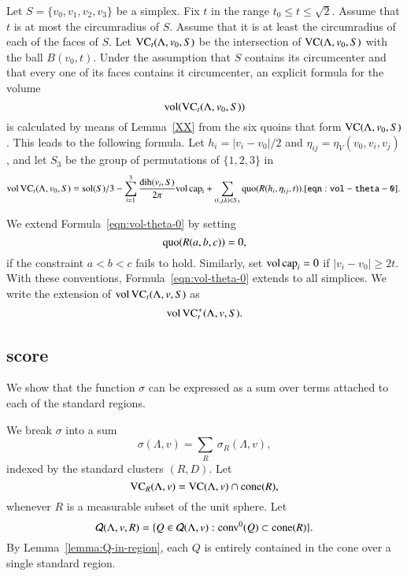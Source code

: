  Let $S=\{v_0,v_1,v_2,v_3\}$ be a simplex. Fix $t$ in the range
$t_0\le t\le\sqrt2$.  Assume that $t$ is at most the circumradius
of $S$. Assume that it is at least the circumradius of each of the
faces of $S$.  Let ${\operatorname{VC}}_t(\Lambda,v_0,S)$ be the intersection of
${\operatorname{VC}}(\Lambda,v_0,S)$ with the ball $B(v_0,t)$. Under the assumption
that $S$ contains its circumcenter and that every one of its faces
contains it circumcenter, an explicit formula for the volume
$${\operatorname{vol}}({\operatorname{VC}}_t(\Lambda,v_0,S))$$ is calculated by means of
Lemma~\ref{XX} from the six quoins that form ${\operatorname{VC}}(\Lambda,v_0,S)$.
This leads to the
following formula. Let $h_i = |v_i-v_0|/2$ and
$\eta_{ij}=\eta_V(v_0,v_i,v_j)$, and let $S_3$ be the group of
permutations of $\{1,2,3\}$ in
\begin{equation}
   \op{vol}\,\op{VC}_t(\Lambda,v_0,S) =
   \sol(S)/3 - \sum_{i=1}^3 \frac{\dih(v_i,S)}{2\pi}\op{vol}\,\op{cap_i}
   +\sum_{(i,j,k)\in S_3} \quo(R(h_i,\eta_{ij},t)).
   \tlabel{eqn:vol-theta-0}
\end{equation}


We extend Formula~\ref{eqn:vol-theta-0} by setting
    $$\operatorname{quo}(R(a,b,c)) = 0,$$
if the constraint $a < b < c$ fails to hold.  Similarly, set
${\operatorname{vol}}\,{\operatorname{cap}}_i=0$ if $|v_i-v_0|\ge 2t$.  With these
conventions,  Formula~\ref{eqn:vol-theta-0} extends to all
simplices.  We write the extension of ${\operatorname{vol}}\,{\operatorname{VC}}_t(\Lambda,v,S)$
as
$${\operatorname{vol}}\,{{\operatorname{VC}}^+_t}(\Lambda,v,S).$$


\subsection{score}

We show that the function $\sigma$ can be expressed as a sum over
terms attached to each of the standard regions.




We break $\sigma$ into a sum
   \begin{equation}
   \sigma(\Lambda,v) = \sum_R\,\sigma_R(\Lambda,v),
   \end{equation}
indexed by the standard clusters $(R,D)$.  Let
   $$
   {\operatorname{VC}}_R(\Lambda,v) = {\operatorname{VC}}(\Lambda,v)\cap {\operatorname{cone}}(R),
   $$
whenever $R$ is a measurable subset of the unit sphere.  Let
   $$
   {\mathcal Q}(\Lambda,v,R) = \{Q\in {\mathcal Q}(\Lambda,v) : {\operatorname{conv}}^0(Q)\subset {\operatorname{cone}}(R)\}.
   $$
By Lemma~\ref{lemma:Q-in-region},
 each $Q$ is entirely contained in the cone over a single
standard region.

